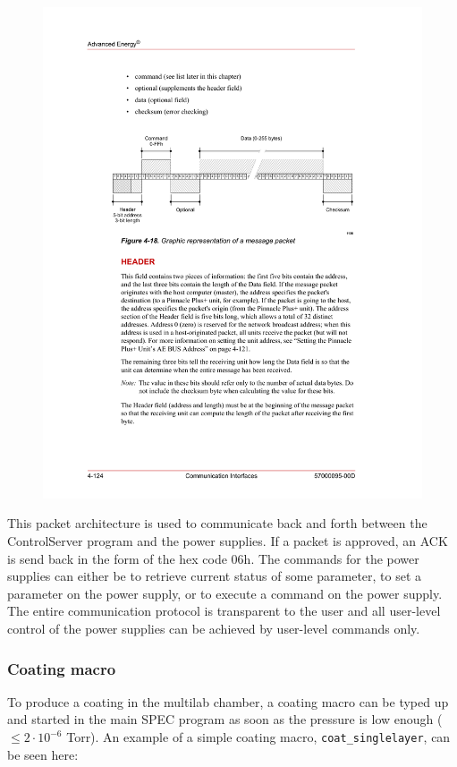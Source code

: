 \begin{figure}[!h]
  \center
  \includegraphics[width=0.9\linewidth]{figures/chamber/ae_packet.pdf}
\caption{\footnotesize }\label{fig:ae_packet}
\end{figure}

This packet architecture is used to communicate back and forth between the ControlServer program and the power supplies. If a packet is approved, an ACK is send back in the form of the hex code 06h. The commands for the power supplies can either be to retrieve current status of some parameter, to set a parameter on the power supply, or to execute a command on the power supply. The entire communication protocol is transparent to the user and all user-level control of the power supplies can be achieved by user-level commands only.

\subsubsection{Coating macro}
To produce a coating in the multilab chamber, a coating macro can be typed up and started in the main SPEC program as soon as the pressure is low enough ($\leq2\cdot10^{-6}$ Torr). An example of a simple coating macro, \verb'coat_singlelayer', can be seen here:

